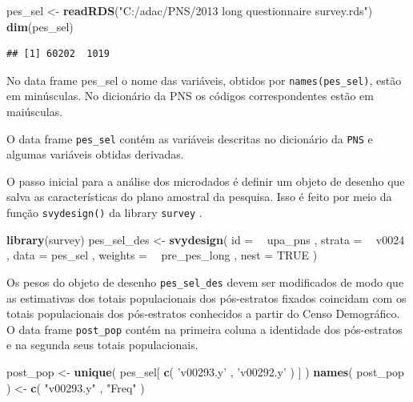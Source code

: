 \documentclass[]{book}
\newenvironment{Shaded}{\begin{snugshade}}{\end{snugshade}}
\newcommand{\KeywordTok}[1]{\textcolor[rgb]{0.13,0.29,0.53}{\textbf{#1}}}
\newcommand{\DataTypeTok}[1]{\textcolor[rgb]{0.13,0.29,0.53}{#1}}
\newcommand{\StringTok}[1]{\textcolor[rgb]{0.31,0.60,0.02}{#1}}
\newcommand{\OtherTok}[1]{\textcolor[rgb]{0.56,0.35,0.01}{#1}}
\newcommand{\OperatorTok}[1]{\textcolor[rgb]{0.81,0.36,0.00}{\textbf{#1}}}
\newcommand{\NormalTok}[1]{#1}
\theoremstyle{definition}
\theoremstyle{definition}
\theoremstyle{definition}
\theoremstyle{remark}
\let\BeginKnitrBlock\begin \let\EndKnitrBlock\end
\begin{document}
\begin{Shaded}
\begin{Highlighting}[]
\NormalTok{pes_sel <-}\StringTok{ }\KeywordTok{readRDS}\NormalTok{(}\StringTok{"C:/adac/PNS/2013 long questionnaire survey.rds"}\NormalTok{)}
\KeywordTok{dim}\NormalTok{(pes_sel)}
\end{Highlighting}
\end{Shaded}

\begin{verbatim}
## [1] 60202  1019
\end{verbatim}

\BeginKnitrBlock{remark}
{}No data frame pes\_sel o nome das
variáveis, obtidos por \texttt{names(pes\_sel)}, estão em minúsculas. No
dicionário da PNS os códigos correspondentes estão em maiúsculas.
\EndKnitrBlock{remark} O data frame \texttt{pes\_sel} contém as
variáveis descritas no dicionário da \texttt{PNS} e algumas variáveis
obtidas derivadas.

O passo inicial para a análise dos microdados é definir um objeto de
desenho que salva as características do plano amostral da pesquisa. Isso
é feito por meio da função \texttt{svydesign()} da library
\texttt{survey} \citep{R-survey}.

\begin{Shaded}
\begin{Highlighting}[]
\KeywordTok{library}\NormalTok{(survey)}
\NormalTok{pes_sel_des <-}
\StringTok{    }\KeywordTok{svydesign}\NormalTok{(}
        \DataTypeTok{id =} \OperatorTok{~}\StringTok{ }\NormalTok{upa_pns ,}
        \DataTypeTok{strata =} \OperatorTok{~}\StringTok{ }\NormalTok{v0024 ,}
        \DataTypeTok{data =}\NormalTok{ pes_sel ,}
        \DataTypeTok{weights =} \OperatorTok{~}\StringTok{ }\NormalTok{pre_pes_long ,}
        \DataTypeTok{nest =} \OtherTok{TRUE}
\NormalTok{    )}
\end{Highlighting}
\end{Shaded}

Os pesos do objeto de desenho \texttt{pes\_sel\_des} devem ser
modificados de modo que as estimativas dos totais populacionais dos
pós-estratos fixados coincidam com os totais populacionais dos
pós-estratos conhecidos a partir do Censo Demográfico. O data frame
\texttt{post\_pop} contém na primeira coluna a identidade dos
pós-estratos e na segunda seus totais populacionais.

\begin{Shaded}
\begin{Highlighting}[]
\NormalTok{post_pop <-}\StringTok{ }\KeywordTok{unique}\NormalTok{( pes_sel[ }\KeywordTok{c}\NormalTok{( }\StringTok{'v00293.y'}\NormalTok{ , }\StringTok{'v00292.y'}\NormalTok{ ) ] )}
\KeywordTok{names}\NormalTok{( post_pop ) <-}\StringTok{ }\KeywordTok{c}\NormalTok{( }\StringTok{"v00293.y"}\NormalTok{ , }\StringTok{"Freq"}\NormalTok{ )}
\end{Highlighting}
\end{Shaded}
\end{document}
